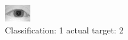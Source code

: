 \begin{figure}[h!]
\begin{center}
\includegraphics[width=0.60\columnwidth]{figures/ID880_class_1_target_2.png}
\end{center}
\caption{ Classification: 1 actual target: 2}
\label{fig:ID880_class_1_target_2}
\end{figure}

